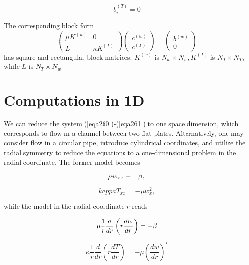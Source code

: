\documentclass[../main.tex]{subfiles}
\begin{document}
		\begin{equation}
			\label{304}	
			b_{i}^{(T)}=0
		\end{equation}
		
		\noindent The corresponding block form
		$$
		\left(\begin{array}{cc}
			\mu K^{(w)} & 0 \\
			L & \kappa K^{(T)}
		\end{array}\right)\left(\begin{array}{c}
			c^{(w)} \\
			c^{(T)}
		\end{array}\right)=\left(\begin{array}{c}
			b^{(w)} \\
			0
		\end{array}\right)
		$$
		has square and rectangular block matrices: $K^{(w)}$ is $N_{w} \times N_{w}, K^{(T)}$ is $N_{T} \times N_{T}$, while $L$ is $N_{T} \times N_{w}$,
	\section[Computations in 1D]{Computations in 1D}
		\label{sec:sec_20_5}
		\noindent We can reduce the system (\ref{eqa260})-(\ref{eqa261}) to one space dimension, which corresponds to flow in a channel between two flat plates. Alternatively, one may consider flow in a circular pipe, introduce cylindrical coordinates, and utilize the radial symmetry to reduce the equations to a one-dimensional problem in the radial coordinate. The former model becomes
		
		\begin{equation}
			\label{eqa305}
			\mu w_{x x}=-\beta, \\
		\end{equation}
	
		\begin{equation}
		\label{eqa306}
			kappa T_{x x}=-\mu w_{x}^{2},
		\end{equation}
		
		\noindent while the model in the radial coordinate $r$ reads
		
		\begin{equation}
			\label{eqa307}
			\mu \frac{1}{r} \frac{d}{d r}\left(r \frac{d w}{d r}\right)=-\beta \\
		\end{equation}
		
		\begin{equation}
			\label{eqa308}
			\kappa \frac{1}{r} \frac{d}{d r}\left(r \frac{d T}{d r}\right)=-\mu\left(\frac{d w}{d r}\right)^{2}
		\end{equation}
		
\end{document}
